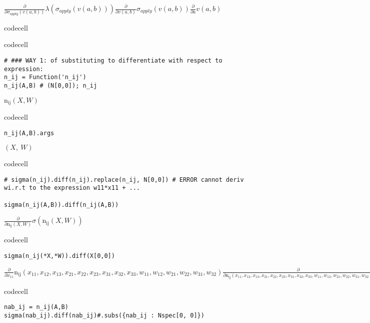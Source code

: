 $\displaystyle \frac{\partial}{\partial \sigma_{apply}{\left(v{\left(a,b \right)} \right)}} \lambda{\left(\sigma_{apply}{\left(v{\left(a,b \right)} \right)} \right)} \frac{\partial}{\partial v{\left(a,b \right)}} \sigma_{apply}{\left(v{\left(a,b \right)} \right)} \frac{\partial}{\partial a} v{\left(a,b \right)}$

codecell

codecell

\begin{verbatim}
# ### WAY 1: of substituting to differentiate with respect to expression:
n_ij = Function('n_ij')
n_ij(A,B) # (N[0,0]); n_ij
\end{verbatim}

$\displaystyle \operatorname{n_{ij}}{\left(X,W \right)}$

codecell

\begin{verbatim}
n_ij(A,B).args
\end{verbatim}

$\displaystyle \left( X, \  W\right)$

codecell

\begin{verbatim}
# sigma(n_ij).diff(n_ij).replace(n_ij, N[0,0]) # ERROR cannot deriv wi.r.t to the expression w11*x11 + ...

sigma(n_ij(A,B)).diff(n_ij(A,B))
\end{verbatim}

$\displaystyle \frac{\partial}{\partial \operatorname{n_{ij}}{\left(X,W \right)}} \sigma{\left(\operatorname{n_{ij}}{\left(X,W \right)} \right)}$

codecell

\begin{verbatim}
sigma(n_ij(*X,*W)).diff(X[0,0])
\end{verbatim}

$\displaystyle \frac{\partial}{\partial x_{11}} \operatorname{n_{ij}}{\left(x_{11},x_{12},x_{13},x_{21},x_{22},x_{23},x_{31},x_{32},x_{33},w_{11},w_{12},w_{21},w_{22},w_{31},w_{32} \right)} \frac{\partial}{\partial \operatorname{n_{ij}}{\left(x_{11},x_{12},x_{13},x_{21},x_{22},x_{23},x_{31},x_{32},x_{33},w_{11},w_{12},w_{21},w_{22},w_{31},w_{32} \right)}} \sigma{\left(\operatorname{n_{ij}}{\left(x_{11},x_{12},x_{13},x_{21},x_{22},x_{23},x_{31},x_{32},x_{33},w_{11},w_{12},w_{21},w_{22},w_{31},w_{32} \right)} \right)}$

codecell

\begin{verbatim}
nab_ij = n_ij(A,B)
sigma(nab_ij).diff(nab_ij)#.subs({nab_ij : Nspec[0, 0]})
\end{verbatim}

